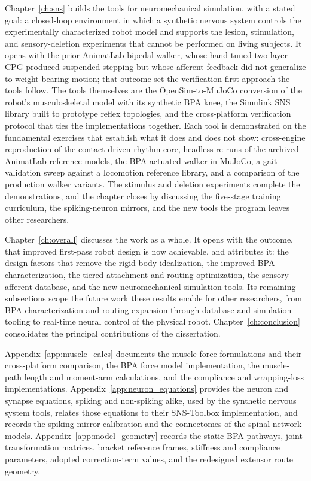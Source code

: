 Chapter~\ref{ch:sns} builds the tools for neuromechanical simulation, with a stated goal: a closed-loop environment in which a synthetic nervous system controls the experimentally characterized robot model and supports the lesion, stimulation, and sensory-deletion experiments that cannot be performed on living subjects. It opens with the prior AnimatLab bipedal walker, whose hand-tuned two-layer CPG produced suspended stepping but whose afferent feedback did not generalize to weight-bearing motion; that outcome set the verification-first approach the tools follow. The tools themselves are the OpenSim-to-MuJoCo conversion of the robot's musculoskeletal model with its synthetic BPA knee, the Simulink SNS library built to prototype reflex topologies, and the cross-platform verification protocol that ties the implementations together. Each tool is demonstrated on the fundamental exercises that establish what it does and does not show: cross-engine reproduction of the contact-driven rhythm core, headless re-runs of the archived AnimatLab reference models, the BPA-actuated walker in MuJoCo, a gait-validation sweep against a locomotion reference library, and a comparison of the production walker variants. The stimulus and deletion experiments complete the demonstrations, and the chapter closes by discussing the five-stage training curriculum, the spiking-neuron mirrors, and the new tools the program leaves other researchers.

Chapter~\ref{ch:overall} discusses the work as a whole. It opens with the outcome, that improved first-pass robot design is now achievable, and attributes it: the design factors that remove the rigid-body idealization, the improved BPA characterization, the tiered attachment and routing optimization, the sensory afferent database, and the new neuromechanical simulation tools. Its remaining subsections scope the future work these results enable for other researchers, from BPA characterization and routing expansion through database and simulation tooling to real-time neural control of the physical robot. Chapter~\ref{ch:conclusion} consolidates the principal contributions of the dissertation.

Appendix~\ref{app:muscle_calcs} documents the muscle force formulations and their cross-platform comparison, the BPA force model implementation, the muscle-path length and moment-arm calculations, and the compliance and wrapping-loss implementations. Appendix~\ref{app:neuron_equations} provides the neuron and synapse equations, spiking and non-spiking alike, used by the synthetic nervous system tools, relates those equations to their SNS-Toolbox implementation, and records the spiking-mirror calibration and the connectomes of the spinal-network models. Appendix~\ref{app:model_geometry} records the static BPA pathways, joint transformation matrices, bracket reference frames, stiffness and compliance parameters, adopted correction-term values, and the redesigned extensor route geometry.
